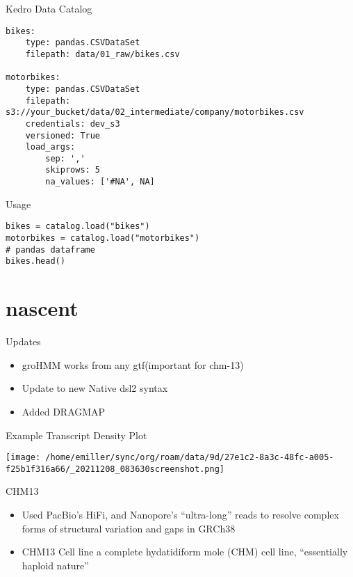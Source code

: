 \documentclass[bigger]{beamer}
\begin{document}
\begin{frame}[label={sec:org99f9caa},fragile]{Kedro Data Catalog}
 \begin{verbatim}
bikes:
    type: pandas.CSVDataSet
    filepath: data/01_raw/bikes.csv

motorbikes:
    type: pandas.CSVDataSet
    filepath: s3://your_bucket/data/02_intermediate/company/motorbikes.csv
    credentials: dev_s3
    versioned: True
    load_args:
        sep: ','
        skiprows: 5
        na_values: ['#NA', NA]
\end{verbatim}
\end{frame}

\begin{frame}[label={sec:org0c297a9},fragile]{Usage}
 \begin{verbatim}
bikes = catalog.load("bikes")
motorbikes = catalog.load("motorbikes")
# pandas dataframe
bikes.head()
\end{verbatim}
\end{frame}

\section{nascent}
\label{sec:org7d7decc}

\begin{frame}[label={sec:orgb1749bb}]{Updates}
\begin{itemize}
\item groHMM works from any gtf(important for chm-13)
\item Update to new Native dsl2 syntax
\item Added DRAGMAP
\end{itemize}
\end{frame}

\begin{frame}[label={sec:orge432c97}]{Example Transcript Density Plot}
\begin{center}
\texttt{[image: /home/emiller/sync/org/roam/data/9d/27e1c2-8a3c-48fc-a005-f25b1f316a66/\_20211208\_083630screenshot.png]}
\end{center}
\end{frame}


\begin{frame}[label={sec:org3246047}]{CHM13}
\begin{itemize}
\item Used PacBio's HiFi, and Nanopore's ``ultra-long'' reads to resolve complex forms
of structural variation and gaps in GRCh38
\item CHM13 Cell line a complete hydatidiform mole (CHM) cell line, ``essentially
haploid nature''
\end{itemize}
\end{frame}
\end{document}
